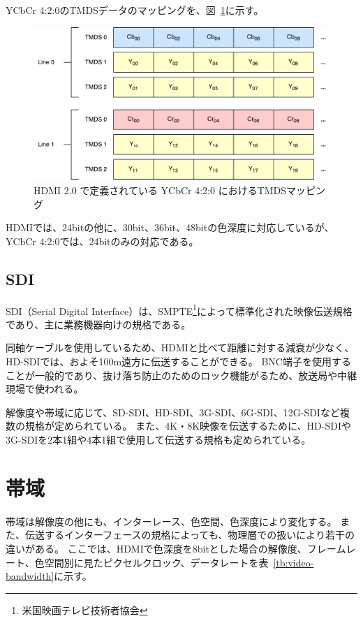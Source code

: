 YCbCr 4:2:0のTMDSデータのマッピングを、図~\ref{fig:hdmi-spec-yuv-420}に示す。

\begin{figure}[htbp]
  \begin{center}
    \includegraphics[bb=0 0 591 306,width=15.5cm]{img/hdmi-spec-yuv-420.pdf}
  \end{center}
  \caption{HDMI 2.0 で定義されている YCbCr 4:2:0 におけるTMDSマッピング}
  \label{fig:hdmi-spec-yuv-420}
\end{figure}

HDMIでは、24bitの他に、30bit、36bit、48bitの色深度に対応しているが、YCbCr 4:2:0では、24bitのみの対応である。

\newpage
\subsection{SDI}

SDI（Serial Digital Interface）は、SMPTE\footnote{米国映画テレビ技術者協会}によって標準化された映像伝送規格であり、主に業務機器向けの規格である。

同軸ケーブルを使用しているため、HDMIと比べて距離に対する減衰が少なく、HD-SDIでは、およそ100m遠方に伝送することができる。
BNC端子を使用することが一般的であり、抜け落ち防止のためのロック機能がるため、放送局や中継現場で使われる。

解像度や帯域に応じて、SD-SDI、HD-SDI、3G-SDI、6G-SDI、12G-SDIなど複数の規格が定められている。
また、4K・8K映像を伝送するために、HD-SDIや3G-SDIを2本1組や4本1組で使用して伝送する規格も定められている。

\section{帯域}
\label{sec:bandwidth}
帯域は解像度の他にも、インターレース、色空間、色深度により変化する。
また、伝送するインターフェースの規格によっても、物理層での扱いにより若干の違いがある。
ここでは、HDMIで色深度を8bitとした場合の解像度、フレームレート、色空間別に見たピクセルクロック、データレートを表~\ref{tb:video-bandwidth}に示す。

